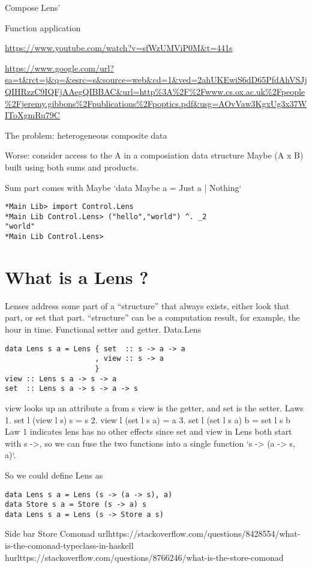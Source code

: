 Compose Lens'

Function application

\url{https://www.youtube.com/watch?v=sfWzUMViP0M&t=441s}

\url{https://www.google.com/url?sa=t&rct=j&q=&esrc=s&source=web&cd=1&ved=2ahUKEwiS6dD65PfdAhVSJjQIHRzzC9IQFjAAegQIBBAC&url=http%3A%2F%2Fwww.cs.ox.ac.uk%2Fpeople%2Fjeremy.gibbons%2Fpublications%2Fpoptics.pdf&usg=AOvVaw3KgxUg3x37WIToXgmRu79C}

The problem: heterogeneous composite data

Worse: consider access to the A in a composiation data structure
Maybe (A x B) built using both sums and products.

Sum part comes with Maybe `data Maybe a = Just a | Nothing`


\begin{verbatim}
*Main Lib> import Control.Lens
*Main Lib Control.Lens> ("hello","world") ^. _2
"world"
*Main Lib Control.Lens>
\end{verbatim}

\section{What is a Lens ?}
Lenses address some part of a “structure” that always exists, either look that part, or set that part.
“structure” can be a computation result, for example, the hour in time. Functional setter and getter.
  Data.Lens


\begin{verbatim}
data Lens s a = Lens { set  :: s -> a -> a
                     , view :: s -> a
                     }
view :: Lens s a -> s -> a
set  :: Lens s a -> s -> a -> s
\end{verbatim}

view looks up an attribute a from s
view is the getter, and set is the setter.
Laws
1. set l (view l s) s = s
2. view l (set l s a) = a
3. set l (set l s a) b = set l s b
Law 1 indicates lens has no other effects
since set and view in Lens both start with s ->, so we can fuse the two functions into a single function
`s -> (a -> s, a)`.

So we could define Lens as
\begin{verbatim}
data Lens s a = Lens (s -> (a -> s), a)
data Store s a = Store (s -> a) s
data Lens s a = Lens (s -> Store a s)
\end{verbatim}

Side bar Store Comonad
url{https://stackoverflow.com/questions/8428554/what-is-the-comonad-typeclass-in-haskell}
hurl{ttps://stackoverflow.com/questions/8766246/what-is-the-store-comonad}

